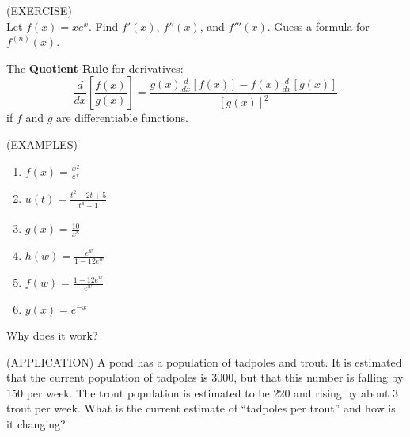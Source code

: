 \documentclass[11pt]{article}
\begin{document}
(EXERCISE)\\
Let $f(x) = xe^x$.  Find $f'(x)$, $f''(x)$, and $f'''(x)$.  Guess a formula for $f^{(n)}(x)$.

\vspace{1.5in}

The {\bf Quotient Rule } for derivatives:
\begin{displaymath}
\frac{d}{dx}\left[\frac{f(x)}{g(x)}  \right] = \frac{g(x)\frac{d}{dx}[f(x)] - f(x)\frac{d}{dx}[g(x)]}{[g(x)]^2}
  \end{displaymath}
if $f$ and $g$ are differentiable functions.

\vspace{0.1in}

  (EXAMPLES)
\begin{enumerate}
\item{$f(x) = \frac{x^2}{e^x}$}
  \vspace{0.5in}
\item{$u(t) = \frac{t^2-2t+5}{t^4+1} $}
    \vspace{1in}
  \item{$g(x) = \frac{10}{x^8}$}
    \vspace{0.5in}
    \item{$h(w) = \frac{e^w}{1-12e^w}$}
    \vspace{0.5in}
    \item{$f(w) = \frac{1-12e^w}{e^w}$}

    \vspace{0.5in}
    \item{$y(x) = e^{-x}$}
\end{enumerate}




\vspace{0.3in}

Why does it work?

\vspace{2.5in}


(APPLICATION)
A pond has a population of tadpoles and trout.  It is estimated that the current population of tadpoles is 3000, but that this
number is falling by 150 per week.  The trout population is estimated to be 220 and rising by about 3 trout per week. What is the current
estimate of ``tadpoles per trout'' and how is it changing?


\pagebreak
\end{document}
